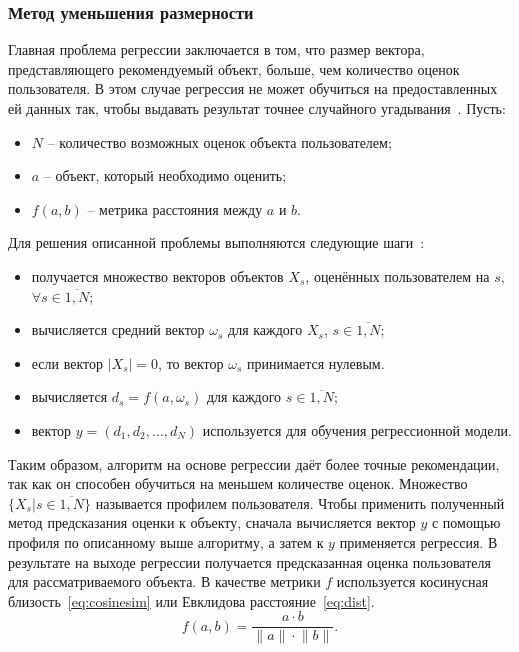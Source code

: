 \subsubsection{Метод уменьшения размерности}
Главная проблема регрессии заключается в том, что размер вектора, представляющего рекомендуемый объект, больше, чем количество оценок пользователя.
В этом случае регрессия не может обучиться на предоставленных ей данных так, чтобы выдавать результат точнее случайного угадывания~\cite{pazzani2007content}.
Пусть:
\begin{itemize}
	\item $N$ -- количество возможных оценок объекта пользователем;
	\item $a$ -- объект, который необходимо оценить;
	\item $f(a, b)$ -- метрика расстояния между $a$ и $b$.
\end{itemize}
Для решения описанной проблемы выполняются следующие шаги~\cite{pazzani2007content}:
\begin{itemize}
	\item получается множество векторов объектов $X_s$, оценённых пользователем на $s$, $\forall s \in \overline{1, N}$;
	\item вычисляется средний вектор $\omega_s$ для каждого $X_s$, $s \in \overline{1, N}$;
	\item если вектор $|X_s| = 0$, то вектор $\omega_s$ принимается нулевым.
	\item вычисляется $d_s = f(a, \omega_s)$ для каждого $s  \in \overline{1, N}$;
	\item вектор $y = (d_1, d_2, \dots, d_N)$ используется для обучения регрессионной модели.
\end{itemize}
Таким образом, алгоритм на основе регрессии даёт более точные рекомендации, так как он способен обучиться на меньшем количестве оценок.
Множество $\{X_s | s \in \overline{1, N}\}$ называется профилем пользователя.
Чтобы применить полученный метод предсказания оценки к объекту, сначала вычисляется вектор $y$ с помощью профиля по описанному выше алгоритму, а затем к $y$ применяется регрессия.
В результате на выходе регрессии получается предсказанная оценка пользователя для рассматриваемого объекта.
В качестве метрики $f$ используется косинусная близость~\eqref{eq:cosinesim} или Евклидова расстояние~\eqref{eq:dist}.
\begin{equation}
	f(a, b) = \frac{a \cdot b}{\lVert a\rVert \cdot \lVert b\rVert}.
	\label{eq:cosinesim}
\end{equation}

